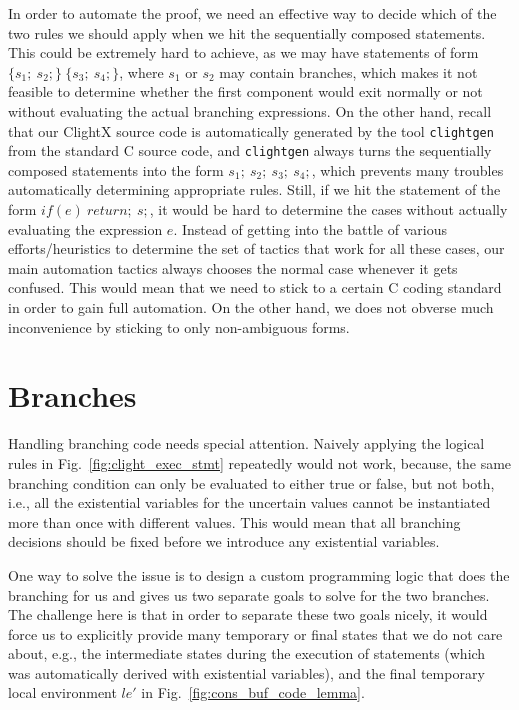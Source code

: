 In order to automate the proof, we need an effective way to decide which
of the two rules we should apply when we hit the sequentially composed statements.
This could be extremely hard to achieve, as we may have statements of form
$\{s_1;~s_2;\}~\{s_3;~s_4;\}$, where $s_1$ or $s_2$ may contain branches,
which makes it not feasible to determine whether the first component would exit
normally or not without evaluating the actual branching expressions.
On the other hand, recall that our ClightX source code is automatically generated
by the tool \texttt{clightgen} from the standard C source code, and \texttt{clightgen}
always turns the sequentially composed statements into the form
$s_1;~s_2;~s_3;~s_4;$, which prevents many troubles automatically determining
appropriate rules. Still, if we hit the statement of the form $if(e)~return;~s;$,
it would be hard to determine the cases without actually evaluating the expression
$e$. Instead of getting into the battle of various efforts/heuristics to determine
the set of tactics that work for all these cases, our main automation tactics
always chooses the normal case whenever it gets confused. This would mean that
we need to stick to a certain C coding standard in order to gain full automation.
On the other hand, we does not obverse much inconvenience by sticking to only
non-ambiguous forms.

\section{Branches}

Handling branching code needs special attention. Naively applying the logical
rules in Fig.~\ref{fig:clight_exec_stmt} repeatedly would not work, because,
the same branching condition can only be evaluated to either true or false,
but not both, i.e., all the existential variables for the uncertain values
cannot be instantiated more than once with different values.
This would mean that all branching decisions should be fixed before we introduce
any existential variables. 

One way to solve the issue is to design a custom programming logic that does
the branching for us and gives us two separate goals to solve for the two branches.
The challenge here is that in order to separate these two goals nicely, it would
force us to explicitly provide many temporary or final states that we do not care
about, e.g., the intermediate states during the execution of statements (which
was automatically derived with existential variables), and the final temporary
local environment $le'$ in Fig.~\ref{fig:cons_buf_code_lemma}.


